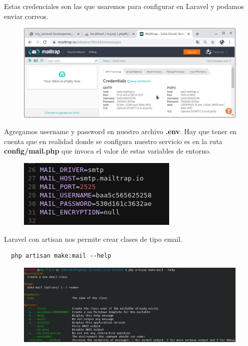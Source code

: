 \documentclass{article}
\begin{document}
Estas credenciales son las que usaremos para configurar en Laravel y podamos
enviar correos.

\newpage

\begin{figure}[h!]
  \centering
  \includegraphics[scale=0.5]{./Pictures/126_credentials.png}
\end{figure}

Agregamos username y password en nuestro archivo \textbf{.env}. Hay que tener
en cuenta que en realidad donde se configura nuestro servicio es en la ruta
\textbf{config/mail.php} que invoca el valor de estas variables de entorno.\\

\begin{figure}[h!]
  \centering
  \includegraphics[scale=0.75]{./Pictures/127_env_credentials.png}
\end{figure}

Laravel con artisan nos permite crear clases de tipo email.

\begin{verbatim}
  php artisan make:mail --help
\end{verbatim}

\begin{figure}[h!]
  \centering
  \includegraphics[scale=0.6]{./Pictures/128_make_mail_help.png}
\end{figure}
\end{document}

